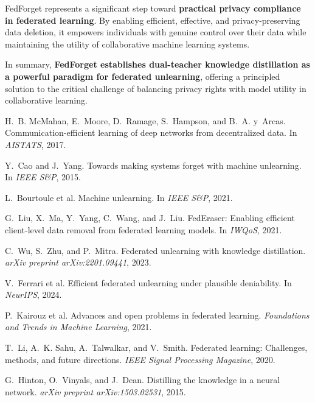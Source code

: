\documentclass[10pt,twocolumn]{article}
\begin{document}
FedForget represents a significant step toward \textbf{practical privacy compliance in federated learning}. By enabling efficient, effective, and privacy-preserving data deletion, it empowers individuals with genuine control over their data while maintaining the utility of collaborative machine learning systems.

In summary, \textbf{FedForget establishes dual-teacher knowledge distillation as a powerful paradigm for federated unlearning}, offering a principled solution to the critical challenge of balancing privacy rights with model utility in collaborative learning.


\begin{thebibliography}{99}

H.~B. McMahan, E.~Moore, D.~Ramage, S.~Hampson, and B.~A. y~Arcas.
\newblock Communication-efficient learning of deep networks from decentralized data.
\newblock In \textit{AISTATS}, 2017.

Y.~Cao and J.~Yang.
\newblock Towards making systems forget with machine unlearning.
\newblock In \textit{IEEE S\&P}, 2015.

L.~Bourtoule et al.
\newblock Machine unlearning.
\newblock In \textit{IEEE S\&P}, 2021.

G.~Liu, X.~Ma, Y.~Yang, C.~Wang, and J.~Liu.
\newblock FedEraser: Enabling efficient client-level data removal from federated learning models.
\newblock In \textit{IWQoS}, 2021.

C.~Wu, S.~Zhu, and P.~Mitra.
\newblock Federated unlearning with knowledge distillation.
\newblock \textit{arXiv preprint arXiv:2201.09441}, 2023.

V.~Ferrari et al.
\newblock Efficient federated unlearning under plausible deniability.
\newblock In \textit{NeurIPS}, 2024.

P.~Kairouz et al.
\newblock Advances and open problems in federated learning.
\newblock \textit{Foundations and Trends in Machine Learning}, 2021.

T.~Li, A.~K. Sahu, A.~Talwalkar, and V.~Smith.
\newblock Federated learning: Challenges, methods, and future directions.
\newblock \textit{IEEE Signal Processing Magazine}, 2020.

G.~Hinton, O.~Vinyals, and J.~Dean.
\newblock Distilling the knowledge in a neural network.
\newblock \textit{arXiv preprint arXiv:1503.02531}, 2015.


\end{thebibliography}
\end{document}
